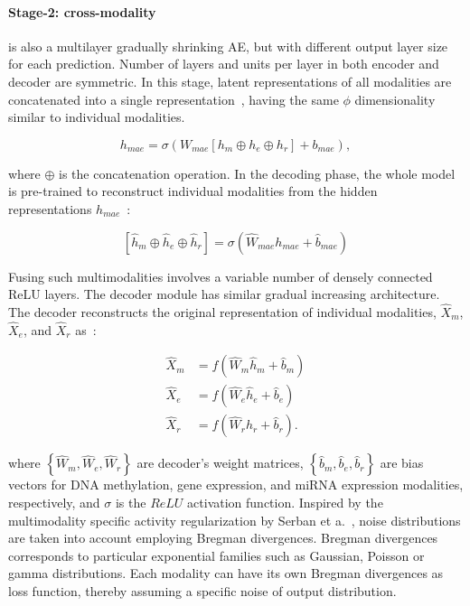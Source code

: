 \paragraph{Stage-2: cross-modality} is also a multilayer gradually shrinking AE, but with different output layer size for each prediction. Number of layers and units per layer in both encoder and decoder are symmetric. In this stage, latent representations of all modalities are concatenated into a single representation~\cite{liu2016multimodal}, having the same $\phi$ dimensionality similar to individual modalities. 

\begin{equation}
    h_{mae}=\sigma\left(W_{mae}\left[h_{m} \oplus h_{e} \oplus h_{r}\right]+b_{mae}\right),
\end{equation}

\hspace*{3.5mm} where $\oplus$ is the concatenation operation. In the decoding phase, the whole model is pre-trained to reconstruct individual modalities from the hidden representations $h_{mae}$~\cite{liu2016multimodal}:

\begin{equation}
    \left[\hat{h}_{m}\oplus \hat{h}_{e} \oplus \hat{h}_{r}
    \right]=\sigma\left(\hat W_{mae} h_{mae}+\hat {b}_{mae}\right)
\end{equation}

\hspace*{3.5mm} Fusing such multimodalities involves a variable number of densely connected ReLU layers. The decoder module has similar gradual increasing architecture. The decoder reconstructs the original representation of individual modalities, $\hat{X}_{m}$, $\hat{X}_{e}$, and $\hat{X}_{r}$ as~\cite{wang2018associativemulti}: 

\begin{equation}
    \begin{aligned}
        \hat{X}_{m} &=f\left(\hat W_{m} \hat{h}_{m}+\hat{b}_{m}\right) \\
        \hat{X}_{e} &=f\left(\hat W_{e} \hat{h}_{e}+\hat{b}_{e}\right) \\
        \hat{X}_{r} &=f\left(\hat W_{r} \hat{h}_{r}+\hat{b}_{r}\right).
        \end{aligned}
\end{equation}

\hspace*{3.5mm} where $\left\{\hat W_{m}, \hat W_{e}, \hat W_{r}\right\}$ are decoder's weight matrices, $\left\{\hat b_{m}, \hat b_{e}, \hat b_{r}\right\}$ are bias vectors for DNA methylation, gene expression, and miRNA expression modalities, respectively, and $\sigma$ is the $ReLU$ activation function. Inspired by the multimodality specific activity regularization by Serban et a.~\cite{serban2016multi}, noise distributions are taken into account employing Bregman divergences. Bregman divergences corresponds to particular exponential families such as Gaussian, Poisson or gamma distributions. Each modality can have its own Bregman divergences as loss function, thereby assuming a specific noise of output distribution. 

